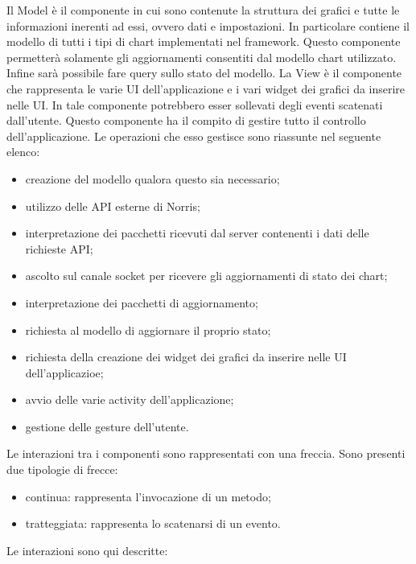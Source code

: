         Il Model è il componente in cui sono contenute la struttura dei grafici e tutte le  informazioni inerenti ad essi, ovvero dati e impostazioni. In particolare contiene il modello di tutti i tipi di chart implementati nel framework. Questo componente permetterà solamente gli aggiornamenti consentiti dal modello chart utilizzato. Infine sarà possibile fare query sullo stato del modello.
        La View è il componente che rappresenta le varie UI dell'applicazione e i vari widget dei grafici da inserire nelle UI. In tale componente potrebbero esser sollevati degli eventi scatenati dall'utente.
        Questo componente ha il compito di gestire tutto il controllo dell'applicazione. Le operazioni che esso gestisce sono riassunte nel seguente elenco:
        	\begin{itemize}
        		\item creazione del modello qualora questo sia necessario;
        		\item utilizzo delle API esterne di Norris;
        		\item interpretazione dei pacchetti ricevuti dal server contenenti i dati delle richieste API;
        		\item ascolto sul canale socket per ricevere gli aggiornamenti di stato dei chart;
        		\item interpretazione dei pacchetti di aggiornamento;
        		\item richiesta al modello di aggiornare il proprio stato;
        		\item richiesta della creazione dei widget dei grafici da inserire nelle UI dell'applicazioe;
        		\item avvio delle varie activity dell'applicazione;
        		\item gestione delle gesture dell'utente.
        \end{itemize}
    	Le interazioni tra i componenti sono rappresentati con una freccia. Sono presenti due tipologie di frecce:
    	\begin{itemize}
    			\item{continua: } rappresenta l'invocazione di un metodo;
    			\item{tratteggiata: } rappresenta lo scatenarsi di un evento.
    		\end{itemize}
    	Le interazioni sono qui descritte:
